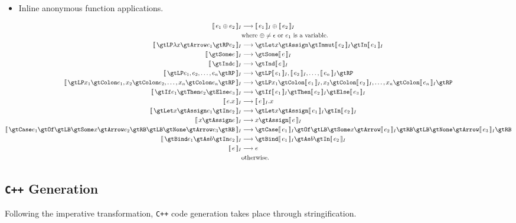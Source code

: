 \documentclass[10pt]{article}
\begin{document}
\begin{itemize}
    \item Inline anonymous function applications.
\end{itemize}
%
\begin{adjustwidth}{-0.5in}{-0.5in}\begin{align*}
    \eqI{e_1 \oplus e_2}{\intI{e_1} \oplus \intI{e_2}}{where $\oplus \neq \epsilon$ or $e_1$ is a variable.} \\
    \eqI{\gtLP \lambda x \gtArrow e_1 \gtRP e_2}{\gtLet x \gtAssign \gtImmut \intI{e_2} \gtIn \intI{e_1}}{} \\
    \eqI{\gtSome e}{\gtSome \intI{e}}{} \\
    \eqI{\gtInd e}{\gtInd \intI{e}}{} \\
    \eqI{\gtLP e_1, e_2, \ldots, e_n \gtRP}{\gtLP \intI{e_1}, \intI{e_2}, \ldots, \intI{e_n} \gtRP}{} \\
    \eqI{\gtLP x_1 \gtColon e_1, x_2 \gtColon e_2, \ldots, x_n \gtColon e_n \gtRP}
        {\gtLP x_1 \gtColon \intI{e_1}, x_2 \gtColon \intI{e_2}, \ldots, x_n \gtColon \intI{e_n} \gtRP}{} \\
    \eqI{\gtIf e_1 \gtThen e_2 \gtElse e_3}{\gtIf \intI{e_1} \gtThen \intI{e_2} \gtElse \intI{e_3}}{} \\
    \eqI{e.x}{\intI{e}.x}{} \\
    \eqI{\gtLet x \gtAssign e_1 \gtIn e_2}{\gtLet x \gtAssign \intI{e_1} \gtIn \intI{e_2}}{} \\
    \eqI{x \gtAssign e}{x \gtAssign \intI{e}}{} \\
    \eqI{\gtCase e_1 \gtOf \gtLB \gtSome x \gtArrow e_2 \gtRB
            \gtLB \gtNone \gtArrow e_3 \gtRB}
        {\gtCase \intI{e_1} \gtOf \gtLB \gtSome x \gtArrow \intI{e_2} \gtRB
            \gtLB \gtNone \gtArrow \intI{e_3} \gtRB}
        {} \\
    \eqI{\gtBind e_1 \gtAs b \gtIn e_2}{\gtBind \intI{e_1} \gtAs b \gtIn \intI{e_2}}{} \\
    \eqI{e}{e}{otherwise.}
\end{align*}\end{adjustwidth}

\subsection{\texttt{C++} Generation}

Following the imperative transformation, \texttt{C++} code generation takes place through
stringification.
\end{document}

